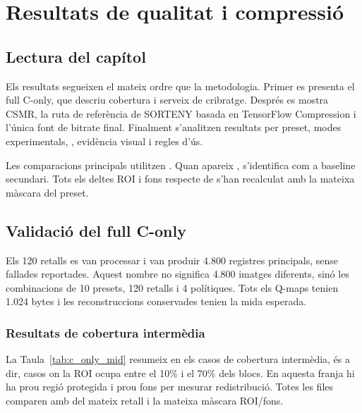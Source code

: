 \chapter{Resultats de qualitat i compressió}\label{ch:resultats}
\fancyhead[LO]{\slshape \textsf{\nouppercase \rightmark}}

\section{Lectura del capítol}\label{sec:result_reading}

Els resultats segueixen el mateix ordre que la metodologia. Primer es presenta
el full C-only, que descriu cobertura i serveix de cribratge. Després es mostra
CSMR, la ruta de referència de SORTENY basada en TensorFlow Compression i
l'única font de bitrate final. Finalment s'analitzen resultats per preset,
modes experimentals, , evidència visual i regles d'ús.

Les comparacions principals utilitzen . Quan apareix
, s'identifica com a baseline secundari. Tots els deltes ROI
i fons respecte de  s'han recalculat amb la mateixa màscara del
preset.

\section{Validació del full C-only}\label{sec:full_results}

Els 120 retalls es van processar i van produir 4.800 registres principals, sense
fallades reportades. Aquest nombre no significa 4.800 imatges diferents, sinó
les combinacions de 10 presets, 120 retalls i 4 polítiques. Tots els Q-maps
tenien 1.024 bytes i les reconstruccions conservades tenien la mida esperada.

\subsection{Resultats de cobertura intermèdia}

La Taula~\ref{tab:c_only_mid} resumeix  en els casos
de cobertura intermèdia, és a dir, casos on la ROI ocupa entre el 10\% i el
70\% dels blocs. En aquesta franja hi ha prou regió protegida i prou fons per
mesurar redistribució. Totes les files comparen  amb
 del mateix retall i la mateixa màscara ROI/fons.

